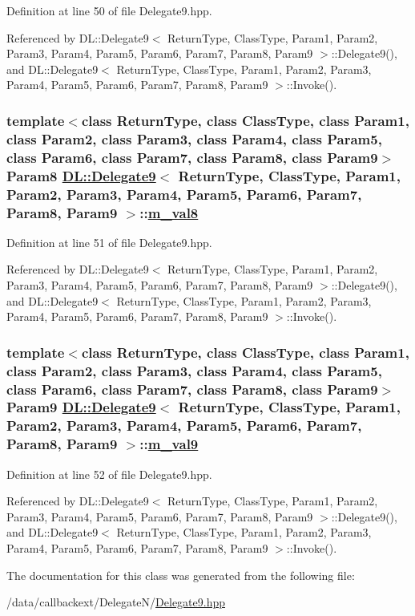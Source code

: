 Definition at line 50 of file Delegate9.hpp.

Referenced by DL::Delegate9$<$ Return\-Type, Class\-Type, Param1, Param2, Param3, Param4, Param5, Param6, Param7, Param8, Param9 $>$::Delegate9(), and DL::Delegate9$<$ Return\-Type, Class\-Type, Param1, Param2, Param3, Param4, Param5, Param6, Param7, Param8, Param9 $>$::Invoke().\hypertarget{classDL_1_1Delegate9_r9}{
\subsubsection[m\_\-val8]{\setlength{\rightskip}{0pt plus 5cm}template$<$class Return\-Type, class Class\-Type, class Param1, class Param2, class Param3, class Param4, class Param5, class Param6, class Param7, class Param8, class Param9$>$ Param8 \hyperlink{classDL_1_1Delegate9}{DL::Delegate9}$<$ Return\-Type, Class\-Type, Param1, Param2, Param3, Param4, Param5, Param6, Param7, Param8, Param9 $>$::\hyperlink{classDL_1_1Delegate9_r9}{m\_\-val8}}}
\label{classDL_1_1Delegate9_r9}




Definition at line 51 of file Delegate9.hpp.

Referenced by DL::Delegate9$<$ Return\-Type, Class\-Type, Param1, Param2, Param3, Param4, Param5, Param6, Param7, Param8, Param9 $>$::Delegate9(), and DL::Delegate9$<$ Return\-Type, Class\-Type, Param1, Param2, Param3, Param4, Param5, Param6, Param7, Param8, Param9 $>$::Invoke().\hypertarget{classDL_1_1Delegate9_r10}{
\subsubsection[m\_\-val9]{\setlength{\rightskip}{0pt plus 5cm}template$<$class Return\-Type, class Class\-Type, class Param1, class Param2, class Param3, class Param4, class Param5, class Param6, class Param7, class Param8, class Param9$>$ Param9 \hyperlink{classDL_1_1Delegate9}{DL::Delegate9}$<$ Return\-Type, Class\-Type, Param1, Param2, Param3, Param4, Param5, Param6, Param7, Param8, Param9 $>$::\hyperlink{classDL_1_1Delegate9_r10}{m\_\-val9}}}
\label{classDL_1_1Delegate9_r10}




Definition at line 52 of file Delegate9.hpp.

Referenced by DL::Delegate9$<$ Return\-Type, Class\-Type, Param1, Param2, Param3, Param4, Param5, Param6, Param7, Param8, Param9 $>$::Delegate9(), and DL::Delegate9$<$ Return\-Type, Class\-Type, Param1, Param2, Param3, Param4, Param5, Param6, Param7, Param8, Param9 $>$::Invoke().

The documentation for this class was generated from the following file:\begin{CompactItemize}
\item 
/data/callbackext/Delegate\-N/\hyperlink{Delegate9_8hpp}{Delegate9.hpp}\end{CompactItemize}
